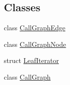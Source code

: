 \subsection*{Classes}
\begin{DoxyCompactItemize}
\item 
class \mbox{\hyperlink{class_call_graph_edge}{Call\+Graph\+Edge}}
\item 
class \mbox{\hyperlink{class_call_graph_node}{Call\+Graph\+Node}}
\item 
struct \mbox{\hyperlink{struct_leaf_iterator}{Leaf\+Iterator}}
\item 
class \mbox{\hyperlink{class_call_graph}{Call\+Graph}}
\end{DoxyCompactItemize}
